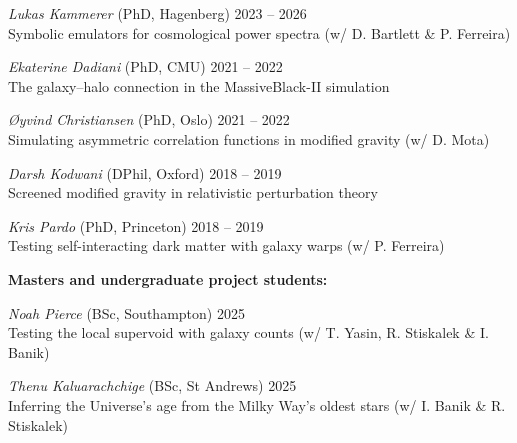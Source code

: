 \documentclass[11pt]{article}
\begin{document}
\textit{Lukas Kammerer} (PhD, Hagenberg) \hfill 2023 -- 2026\\
Symbolic emulators for cosmological power spectra (w/ D. Bartlett \& P. Ferreira)\\

\vspace{-0.5\baselineskip}

\textit{Ekaterine Dadiani} (PhD, CMU) \hfill 2021 -- 2022\\
The galaxy--halo connection in the MassiveBlack-II simulation\\

\vspace{-0.5\baselineskip}

\textit{\O{}yvind Christiansen} (PhD, Oslo) \hfill 2021 -- 2022\\
Simulating asymmetric correlation functions in modified gravity (w/ D. Mota)\\

\vspace{-0.5\baselineskip}

\textit{Darsh Kodwani} (DPhil, Oxford) \hfill 2018 -- 2019\\
Screened modified gravity in relativistic perturbation theory\\

\vspace{-0.5\baselineskip}

\textit{Kris Pardo} (PhD, Princeton) \hfill 2018 -- 2019\\
Testing self-interacting dark matter with galaxy warps (w/ P. Ferreira)\\

\vspace{0.5\baselineskip}

\textbf{Masters and undergraduate project students:}

\vspace{0.4\baselineskip}

\textit{Noah Pierce} (BSc, Southampton) \hfill 2025\\
Testing the local supervoid with galaxy counts (w/ T. Yasin, R. Stiskalek \& I. Banik)\\

\vspace{-0.5\baselineskip}

\textit{Thenu Kaluarachchige} (BSc, St Andrews) \hfill 2025\\
Inferring the Universe's age from the Milky Way's oldest stars (w/ I. Banik \& R. Stiskalek)\\
\end{document}
